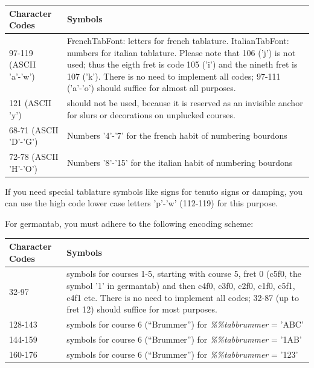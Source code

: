 \documentclass[a4paper]{article}
\begin{document}
\begin{center}
\begin{tabular}{|l|p{9cm}|} \hline
{\bf Character Codes} & {\bf Symbols} \\ \hline
97-119 (ASCII 'a'-'w') & 
    FrenchTabFont: letters for french tablature.\newline
    ItalianTabFont: numbers for italian tablature.\newline
    Please note that 106 ('j') is not used; thus the eigth
    fret is code 105 ('i') and the nineth fret is 107 ('k').\newline
    There is no need to implement all codes; 97-111 ('a'-'o') should
    suffice for almost all purposes. \\ \hline
121 (ASCII 'y') &
    should not be used, because it is reserved as an invisible anchor for
    slurs or decorations on unplucked courses. \\ \hline
68-71 (ASCII 'D'-'G') &
    Numbers '4'-'7' for the french habit of numbering bourdons \\ \hline
72-78 (ASCII 'H'-'O') &
    Numbers '8'-'15' for the italian habit of numbering bourdons \\ \hline
\end{tabular}
\end{center}

If you need special tablature symbols like signs for tenuto signs or damping,
you can use the high code lower case letters 'p'-'w' (112-119) for this
purpose.
\par
For germantab, you must adhere to the following encoding scheme:
\begin{center}
\begin{tabular}{|l|p{10cm}|} \hline
{\bf Character Codes} & {\bf Symbols} \\ \hline
32-97 & symbols for courses 1-5, starting with course 5, fret 0 (c5f0, the
    symbol '1' in germantab) and then c4f0, c3f0, c2f0, c1f0, c5f1, c4f1 etc.
    \newline
    There is no need to implement all codes; 32-87 (up to fret 12) should
    suffice for most purposes. \\ \hline
128-143  & symbols for course 6 (``Brummer'') for {\it \%\%tabbrummer} = 'ABC'
    \\ \hline
144-159  & symbols for course 6 (``Brummer'') for {\it \%\%tabbrummer} = '1AB'
    \\ \hline
160-176  & symbols for course 6 (``Brummer'') for {\it \%\%tabbrummer} = '123'
    \\ \hline
\end{tabular}
\end{center}
\end{document}

